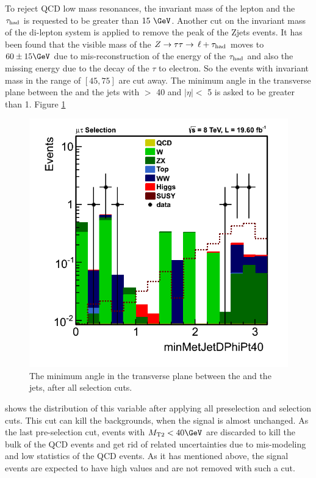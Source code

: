 To reject QCD low mass resonances, the invariant mass of the lepton and the $\tau_{\rm had}$ is requested to be greater than $15\ \GeV$. Another cut on the invariant mass of the di-lepton system is applied to remove the peak of the Zjets events. It has been found that the visible mass of the $Z\to\tau\tau\to\,\ell +\tau_{\rm had}$ moves to $60 \pm 15 \GeV$ due to mis-reconstruction of the energy of the $\tau_{\rm had}$ and also the missing energy due to the decay of the $\tau$ to electron. So the events with invariant mass in the range of $[45,75]$ are cut away. The minimum angle in the transverse plane between the \MPT and the jets with \PT $>$ 40 \GeVc and $|\eta| <$ 5 is asked to be greater than 1. Figure \ref{fig:minDphi}
\begin{figure}[!Hhtb]
\centering
\includegraphics[angle=0,scale=0.35]{SelectionMuTau/minMetJetDPhi.png}
\caption{The minimum angle in the transverse plane between the \MPT and the jets, after all \muTau selection cuts.}
\label{fig:minDphi}
\end{figure}
shows the distribution of this variable after applying all preselection and selection cuts. This cut can kill the backgrounds, 
when the signal is almost unchanged.
As the last pre-selection cut, events with $\mttwo<40 \GeV$ are discarded to kill the bulk of the QCD events and get rid of related uncertainties due to mis-modeling and low statistics 
of the QCD events. As it has mentioned above, the signal events are expected to have high \mttwo values and are not removed with such a cut.

